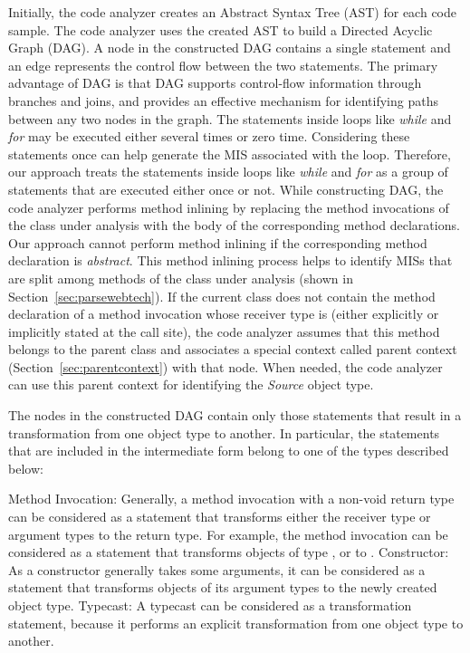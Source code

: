 \documentclass{fp035-thummalapenta}
\begin{document}
Initially, the code analyzer creates an Abstract Syntax Tree (AST)
for each code sample. The code analyzer uses the created AST to
build a Directed Acyclic Graph (DAG). A node in the constructed DAG
contains a single statement and an edge represents the control flow
between the two statements. The primary advantage of DAG is that DAG
supports control-flow information through branches and joins, and
provides an effective mechanism for identifying paths between any
two nodes in the graph. The statements inside loops like
\emph{while} and \emph{for} may be executed either several times or
zero time. Considering these statements once can help generate the
MIS associated with the loop. Therefore, our approach treats the
statements inside loops like \emph{while} and \emph{for} as a group
of statements that are executed either once or not. While
constructing DAG, the code analyzer performs method inlining by
replacing the method invocations of the class under analysis with
the body of the corresponding method declarations. Our approach
cannot perform method inlining if the corresponding method
declaration is \emph{abstract}. This method inlining process helps
to identify MISs that are split among methods of the class under
analysis (shown in Section~\ref{sec:parsewebtech}). If the current
class does not contain the method declaration of a method invocation
whose receiver type is  (either explicitly or
implicitly stated at the call site), the code analyzer assumes that
this method belongs to the parent class and associates a special
context called parent context (Section~\ref{sec:parentcontext}) with
that node. When needed, the code analyzer can use this parent
context for identifying the \emph{Source} object type.

The nodes in the constructed DAG contain only those statements that
result in a transformation from one object type to another. In
particular, the statements that are included in the intermediate
form belong to one of the types described below:

\begin{Itemize}
\Item Method Invocation: Generally, a method invocation with a
non-void return type can be considered as a statement that
transforms either the receiver type  or argument types to the return type. For example, the
method invocation  can be considered as a statement that transforms objects of
type ,  or  to
.
%
\Item Constructor: As a constructor generally takes some arguments,
it can be considered as a statement that transforms objects of its
argument types to the newly created object type.
%
\Item Typecast: A typecast can be considered as a transformation
statement, because it performs an explicit transformation from one
object type to another.
\end{Itemize}
\end{document}
